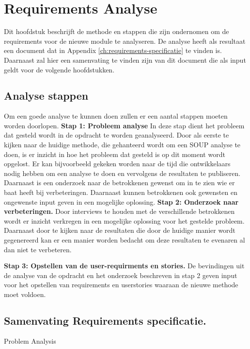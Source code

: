 
\chapter{Requirements Analyse}\label{ch:requirements-analyse}
Dit hoofdstuk beschrijft de methode en stappen die zijn ondernomen om de requirements voor de nieuwe module te analyseren. De analyse heeft als resultaat een document dat in Appendix \ref{ch:requirements-specificatie} te vinden is. Daarnaast zal hier een samenvating te vinden zijn van dit document die als input geldt voor de volgende hoofdstukken.

\section{Analyse stappen}\label{sec:analyse-stappen}
Om een goede analyse te kunnen doen zullen er een aantal stappen  moeten worden doorlopen.
\textbf{Stap 1: Probleem analyse}
In deze stap dient het probleem dat gesteld wordt in de opdracht te worden geanalyseerd. Door als eerste te kijken naar de huidige methode, die gehanteerd wordt om een SOUP analyse te doen, is er inzicht in hoe het probleem dat gesteld is op dit moment wordt opgelost. Er kan bijvoorbeeld gekeken worden naar de tijd die ontwikkelaars nodig hebben om een analyse te doen en vervolgens de resultaten te publiseren. Daarnaast is een onderzoek naar de betrokkenen gewenst om in te zien wie er baat heeft bij verbeteringen. Daarnaast kunnen betrokkenen ook gewensten en ongewenste input geven in een mogelijke oplossing.
\textbf{Stap 2: Onderzoek naar verbeteringen.}
Door interviews te houden met de verschillende betrokkenen wordt er inzicht verkregen in een mogelijke oplossing voor het gestelde probleem. Daarnaast door te kijken naar de resultaten die door de huidige manier wordt gegenereerd kan er een manier worden bedacht om deze resultaten te evenaren al dan niet te verbeteren.

\textbf{Stap 3: Opstellen van de user-requirments en stories.}
De bevindingen uit de analyse van de opdracht en het onderzoek beschreven in stap 2 geven input voor het opstellen van requirements en userstories waaraan de nieuwe methode moet voldoen.

\section{Samenvating Requirements specificatie.}



Problem Analysis


